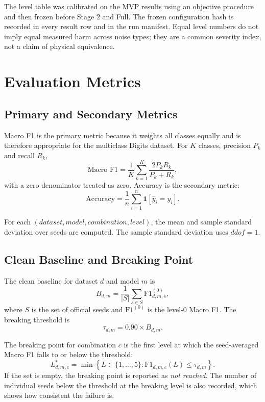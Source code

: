 The level table was calibrated on the MVP results using an objective procedure and then frozen before Stage 2 and Full. The frozen configuration hash is recorded in every result row and in the run manifest. Equal level numbers do not imply equal measured harm across noise types; they are a common severity index, not a claim of physical equivalence.

\section{Evaluation Metrics}

\subsection{Primary and Secondary Metrics}

Macro F1 is the primary metric because it weights all classes equally and is therefore appropriate for the multiclass Digits dataset. For $K$ classes, precision $P_k$ and recall $R_k$,
\begin{equation}
\text{Macro F1} = \frac{1}{K}\sum_{k=1}^{K} \frac{2 P_k R_k}{P_k + R_k},
\end{equation}
with a zero denominator treated as zero. Accuracy is the secondary metric:
\begin{equation}
\text{Accuracy} = \frac{1}{n}\sum_{i=1}^{n} \mathbf{1}\left[\hat{y}_i = y_i\right].
\end{equation}

For each $(dataset, model, combination, level)$, the mean and sample standard deviation over seeds are computed. The sample standard deviation uses $ddof=1$.

\subsection{Clean Baseline and Breaking Point}

The clean baseline for dataset $d$ and model $m$ is
\begin{equation}
B_{d,m} = \frac{1}{|S|}\sum_{s \in S} \text{F1}^{(0)}_{d,m,s},
\end{equation}
where $S$ is the set of official seeds and $\text{F1}^{(0)}$ is the level-0 Macro F1. The breaking threshold is
\begin{equation}
\tau_{d,m} = 0.90 \times B_{d,m}.
\end{equation}

The breaking point for combination $c$ is the first level at which the seed-averaged Macro F1 falls to or below the threshold:
\begin{equation}
L^{*}_{d,m,c} = \min\left\{ L \in \{1,\ldots,5\} : \overline{\text{F1}}_{d,m,c}(L) \leq \tau_{d,m} \right\}.
\end{equation}
If the set is empty, the breaking point is reported as \emph{not reached}. The number of individual seeds below the threshold at the breaking level is also recorded, which shows how consistent the failure is.


